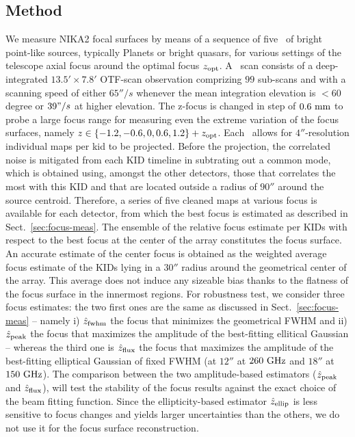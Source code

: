 \subsection{Method}

We measure NIKA2 focal surfaces by means of a sequence of five \bms\ of bright
point-like sources, typically Planets or bright quasars, for various settings of
the telescope axial focus around the optimal focus $z_{\rm{opt}}$. A \bm\
scan consists of a deep-integrated $13.5' \times 7.8'$ OTF-scan observation
comprizing $99$ sub-scans and with a scanning speed of either $65''/s$ whenever
the mean integration elevation is $< 60$ degree or $39"/s$ at higher
elevation. The z-focus is changed in step of $0.6~\rm{mm}$ to probe a large
focus range for measuring even the extreme variation of the focus surfaces,
namely $z \in \{-1.2, -0.6, 0, 0.6, 1.2 \} + z_{\rm{opt}}$.  Each \bm\
allows for $4''$-resolution individual maps per kid to be projected. Before the
projection, the correlated noise is mitigated from each KID timeline in
subtrating out a common mode, which is obtained using, amongst the other
detectors, those that correlates the most with this KID and that are located
outside a radius of $90''$ around the source centroid.  Therefore, a series of
five cleaned maps at various focus is available for each detector, from which
the best focus is estimated as described in Sect.~\ref{sec:focus-meas}. The
ensemble of the relative focus estimate per KIDs with respect to the best focus
at the center of the array constitutes the focus surface. An accurate estimate
of the center focus is obtained as the weighted average focus estimate of the
KIDs lying in a $30''$ radius around the geometrical center of the array. This
average does not induce any sizeable bias thanks to the flatness of the focus
surface in the innermost regions. For robustness test, we consider three focus
estimates: the two first ones are the same as discussed in
Sect.~\ref{sec:focus-meas} -- namely i) $\hat z_{\rm{fwhm}}$ the focus that
minimizes the geometrical FWHM and ii) $\hat z_{\rm{peak}}$ the focus that
maximizes the amplitude of the best-fitting ellitical Gaussian -- whereas the
third one is $\hat z_{\rm{flux}}$ the focus that maximizes the amplitude of the
best-fitting elliptical Gaussian of fixed FWHM (at $12''$ at $260~\rm{GHz}$ and
$18''$ at $150~\rm{GHz}$). The comparison between the two amplitude-based
estimators ($\hat z_{\rm{peak}}$ and $\hat z_{\rm{flux}}$), will test the
stability of the focus results against the exact choice of the beam fitting
function. Since the ellipticity-based estimator $\hat z_{\rm{ellip}}$ is less
sensitive to focus changes and yields larger uncertainties than the others, we
do not use it for the focus surface reconstruction.


